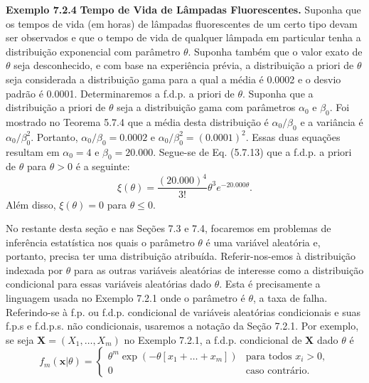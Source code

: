 \vspace{1cm}
\noindent\textbf{Exemplo 7.2.4} \quad \textbf{Tempo de Vida de Lâmpadas Fluorescentes.} Suponha que os tempos de vida (em horas) de lâmpadas fluorescentes de um certo tipo devam ser observados e que o tempo de vida de qualquer lâmpada em particular tenha a distribuição exponencial com parâmetro $\theta$. Suponha também que o valor exato de $\theta$ seja desconhecido, e com base na experiência prévia, a distribuição a priori de $\theta$ seja considerada a distribuição gama para a qual a média é 0.0002 e o desvio padrão é 0.0001. Determinaremos a f.d.p. a priori de $\theta$.
Suponha que a distribuição a priori de $\theta$ seja a distribuição gama com parâmetros $\alpha_0$ e $\beta_0$. Foi mostrado no Teorema 5.7.4 que a média desta distribuição é $\alpha_0/\beta_0$ e a variância é $\alpha_0/\beta_0^2$. Portanto, $\alpha_0/\beta_0 = 0.0002$ e $\alpha_0/\beta_0^2 = (0.0001)^2$. Essas duas equações resultam em $\alpha_0=4$ e $\beta_0=20.000$. Segue-se de Eq. (5.7.13) que a f.d.p. a priori de $\theta$ para $\theta > 0$ é a seguinte:
\begin{equation}
\xi(\theta) = \frac{(20.000)^4}{3!} \theta^3 e^{-20.000\theta}. \tag{7.2.2}
\end{equation}
Além disso, $\xi(\theta)=0$ para $\theta \le 0$.

\vspace{1cm}
No restante desta seção e nas Seções 7.3 e 7.4, focaremos em problemas de inferência estatística nos quais o parâmetro $\theta$ é uma variável aleatória e, portanto, precisa ter uma distribuição atribuída. Referir-nos-emos à distribuição indexada por $\theta$ para as outras variáveis aleatórias de interesse como a distribuição condicional para essas variáveis aleatórias dado $\theta$. Esta é precisamente a linguagem usada no Exemplo 7.2.1 onde o parâmetro é $\theta$, a taxa de falha. Referindo-se à f.p. ou f.d.p. condicional de variáveis aleatórias condicionais e suas f.p.s e f.d.p.s. não condicionais, usaremos a notação da Seção 7.2.1. Por exemplo, se seja $\mathbf{X}=(X_1, \dots, X_m)$ no Exemplo 7.2.1, a f.d.p. condicional de $\mathbf{X}$ dado $\theta$ é
\begin{equation}
f_m(\mathbf{x}|\theta) = 
\begin{cases}
\theta^m \exp(-\theta[x_1 + \dots + x_m]) & \text{para todos } x_i > 0, \\
0 & \text{caso contrário}.
\end{cases}
\tag{7.2.3}
\end{equation}

